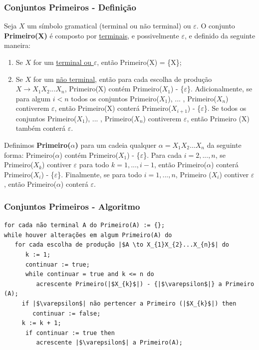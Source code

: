 \documentclass[table]{beamer}
\begin{document}
\begin{frame}
   \frametitle{Conjuntos Primeiros - Definição}
   \small
   Seja $X$ um símbolo gramatical (terminal ou não terminal) ou $\varepsilon$. O conjunto \textbf{Primeiro(X)} é composto por \underline{terminais}, e possivelmente $\varepsilon$, e definido da seguinte maneira:
   \begin{enumerate}
      \item Se $X$ for um \underline{terminal ou $\varepsilon$}, então Primeiro(X) = \{X\};
      \item Se $X$ for um \underline{não terminal}, então para cada escolha de produção $X \to X_{1}X_{2}...X_{n}$, Primeiro(X) contém Primeiro($X_{1}$) - \{$\varepsilon$\}. Adicionalmente, se para algum $i<n$ todos os conjuntos Primeiro($X_{1}$), ... , Primeiro($X_{n}$) contiverem $\varepsilon$, então Primeiro(X) conterá Primeiro($X_{i+1}$) - \{$\varepsilon$\}. Se todos os conjuntos Primeiro($X_{1}$), ... , Primeiro($X_{n}$) contiverem $\varepsilon$, então Primeiro (X) também conterá $\varepsilon$. 
   \end{enumerate}
   Definimos \textbf{Primeiro($\alpha$)} para um cadeia qualquer $\alpha = X_{1}X_{2}...X_{n}$ da seguinte forma: Primeiro($\alpha$) contém Primeiro($X_{1}$) - \{$\varepsilon$\}. Para cada $i=2, ..., n$, se Primeiro($X_{k}$) contiver $\varepsilon$ para todo $k = 1, ..., i-1$, então Primeiro($\alpha$) conterá Primeiro($X_{i}$) - \{$\varepsilon$\}. Finalmente, se para todo $i = 1, ..., n$, Primeiro ($X_{i}$) contiver $\varepsilon$, então Primeiro($\alpha$) conterá $\varepsilon$.
\end{frame}

\begin{frame}[fragile]
   \frametitle{Conjuntos Primeiros - Algoritmo}
   \begin{verbatim}
for cada não terminal A do Primeiro(A) := {};
while houver alterações em algum Primeiro(A) do
   for cada escolha de produção |$A \to X_{1}X_{2}...X_{n}$| do
      k := 1;
      continuar := true;
      while continuar = true and k <= n do
         acrescente Primeiro(|$X_{k}$|) - {|$\varepsilon$|} a Primeiro (A);
	 if |$\varepsilon$| não pertencer a Primeiro (|$X_{k}$|) then 
	    continuar := false;
	 k := k + 1;
      if continuar := true then
         acrescente |$\varepsilon$| a Primeiro(A);
   \end{verbatim}
\end{frame}
\end{document}
